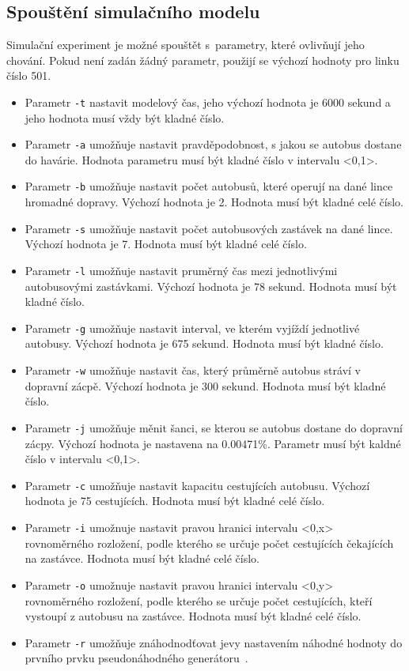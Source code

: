 \documentclass[a4paper]{article}
\begin{document}
        \subsection{Spouštění simulačního modelu}
        \label{subsec:start}

            Simulační experiment je možné spouštět s~parametry, které ovlivňují jeho chování. Pokud není zadán žádný parametr, použijí se výchozí hodnoty pro linku číslo 501.
            
            \begin{itemize}
                \item Parametr \texttt{-t}  nastavit modelový čas, jeho výchozí hodnota je 6000 sekund a jeho hodnota musí vždy být kladné číslo.
                \item Parametr \texttt{-a} umožňuje nastavit pravděpodobnost, s jakou se autobus dostane do havárie. Hodnota parametru musí být kladné číslo v intervalu <0,1>.
                \item Parametr \texttt{-b} umožňuje nastavit počet autobusů, které operují na dané lince hromadné dopravy. Výchozí hodnota je 2. Hodnota musí být kladné celé číslo.
                \item Parametr \texttt{-s} umožňuje nastavit počet autobusových zastávek na dané lince. Výchozí hodnota je 7. Hodnota musí být kladné celé číslo.
                \item Parametr \texttt{-l} umožňuje nastavit pruměrný čas mezi jednotlivými autobusovými zastávkami. Výchozí hodnota je 78 sekund. Hodnota musí být kladné číslo.
                \item Parametr \texttt{-g} umožňuje nastavit interval, ve kterém vyjíždí jednotlivé autobusy. Výchozí hodnota je 675 sekund. Hodnota musí být kladné číslo.
                \item Parametr \texttt{-w} umožňuje nastavit čas, který průměrně autobus stráví v dopravní zácpě. Výchozí hodnota je 300 sekund. Hodnota musí být kladné číslo.
                \item Parametr \texttt{-j} umožňuje měnit šanci, se kterou se autobus dostane do dopravní zácpy. Výchozí hodnota je nastavena na 0.00471\%. Parametr musí být kaldné číslo v intervalu <0,1>.
                \item Parametr \texttt{-c} umožňuje nastavit kapacitu cestujících autobusu. Výchozí hodnota je 75 cestujících. Hodnota musí být kladné  celé číslo.
            
            \item Parametr \texttt{-i} umožnuje nastavit pravou hranici intervalu <0,x> rovnoměrného rozložení, podle kterého se určuje počet cestujících čekajících na zastávce. Hodnota musí být kladné celé číslo.
            \item Parametr \texttt{-o} umožnuje nastavit pravou hranici intervalu <0,y> rovnoměrného rozložení, podle kterého se určuje počet cestujících, kteří vystoupí z autobusu na zastávce. Hodnota musí být kladné celé číslo.
            \item Parametr \texttt{-r} umožňuje znáhodnodťovat jevy nastavením náhodné hodnoty do prvního prvku pseudonáhodného generátoru~\cite[snímek 72]{IMS_slides}. 
            \end{itemize}
\end{document}
